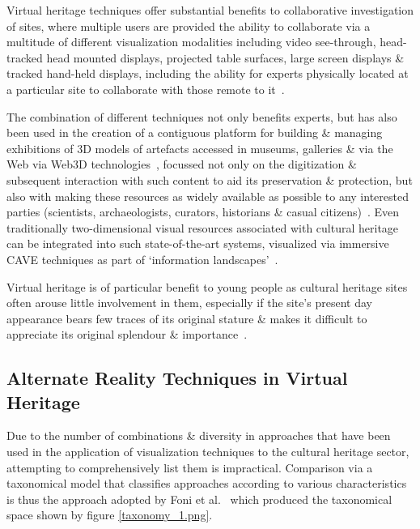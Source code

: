 Virtual heritage techniques offer substantial benefits to collaborative investigation of sites, where multiple users are provided the ability to collaborate via a multitude of different visualization modalities including video see-through, head-tracked head mounted displays, projected table surfaces, large screen displays \& tracked hand-held displays, including the ability for experts physically located at a particular site to collaborate with those remote to it~\cite{benko:collaborative}.

The combination of different techniques not only benefits experts, but has also been used in the creation of a contiguous platform for building \& managing exhibitions of 3D models of artefacts accessed in museums, galleries \& via the Web via Web3D technologies~\cite{Wojciechowski2004}, focussed not only on the digitization \& subsequent interaction with such content to aid its preservation \& protection, but also with making these resources as widely available as possible to any interested parties (scientists, archaeologists, curators, historians \& casual citizens)~\cite{walczak:applications}. Even traditionally two-dimensional visual resources associated with cultural heritage can be integrated into such state-of-the-art systems, visualized via immersive CAVE techniques as part of `information landscapes'~\cite{Ruffaldi2008}.

Virtual heritage is of particular benefit to young people as cultural heritage sites often arouse little involvement in them, especially if the site's present day appearance bears few traces of its original stature \& makes it difficult to appreciate its original splendour \& importance~\cite{ardito:combining}.


\subsection{Alternate Reality Techniques in Virtual Heritage}

Due to the number of combinations \& diversity in approaches that have been used in the application of visualization techniques to the cultural heritage sector, attempting to comprehensively list them is impractical. Comparison via a taxonomical model that classifies approaches according to various characteristics is thus the approach adopted by Foni et al.~\cite{Foni2010} which produced the taxonomical space shown by figure \ref{taxonomy_1.png}.

